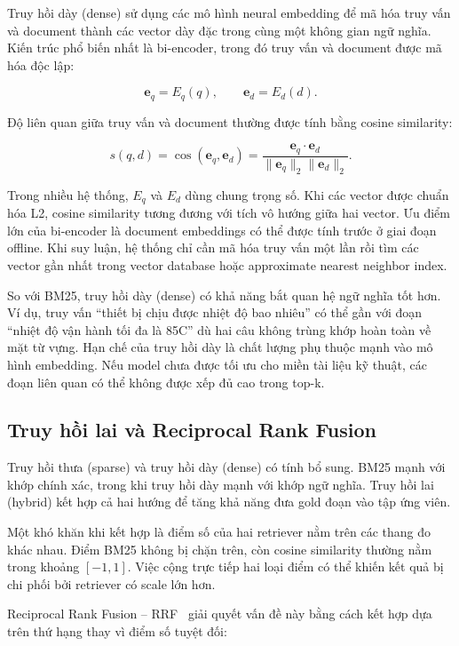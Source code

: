 \documentclass[../DoAn.tex]{subfiles}
\begin{document}
Truy hồi dày (dense) sử dụng các mô hình neural embedding để mã hóa truy vấn và document thành các vector dày đặc trong cùng một không gian ngữ nghĩa. Kiến trúc phổ biến nhất là bi-encoder, trong đó truy vấn và document được mã hóa độc lập:

\[
\mathbf{e}_q = E_q(q),
\qquad
\mathbf{e}_d = E_d(d).
\]

Độ liên quan giữa truy vấn và document thường được tính bằng cosine similarity:

\[
s(q,d)
=
\cos(\mathbf{e}_q,\mathbf{e}_d)
=
\frac{
\mathbf{e}_q \cdot \mathbf{e}_d
}{
\|\mathbf{e}_q\|_2 \|\mathbf{e}_d\|_2
}.
\]

Trong nhiều hệ thống, $E_q$ và $E_d$ dùng chung trọng số. Khi các vector được chuẩn hóa L2, cosine similarity tương đương với tích vô hướng giữa hai vector. Ưu điểm lớn của bi-encoder là document embeddings có thể được tính trước ở giai đoạn offline. Khi suy luận, hệ thống chỉ cần mã hóa truy vấn một lần rồi tìm các vector gần nhất trong vector database hoặc approximate nearest neighbor index.

So với BM25, truy hồi dày (dense) có khả năng bắt quan hệ ngữ nghĩa tốt hơn. Ví dụ, truy vấn ``thiết bị chịu được nhiệt độ bao nhiêu'' có thể gần với đoạn ``nhiệt độ vận hành tối đa là 85\textdegree C'' dù hai câu không trùng khớp hoàn toàn về mặt từ vựng. Hạn chế của truy hồi dày là chất lượng phụ thuộc mạnh vào mô hình embedding. Nếu model chưa được tối ưu cho miền tài liệu kỹ thuật, các đoạn liên quan có thể không được xếp đủ cao trong top-k.

\subsection{Truy hồi lai và Reciprocal Rank Fusion}
\label{subsection:2.2.3}

Truy hồi thưa (sparse) và truy hồi dày (dense) có tính bổ sung. BM25 mạnh với khớp chính xác, trong khi truy hồi dày mạnh với khớp ngữ nghĩa. Truy hồi lai (hybrid) kết hợp cả hai hướng để tăng khả năng đưa gold đoạn vào tập ứng viên.

Một khó khăn khi kết hợp là điểm số của hai retriever nằm trên các thang đo khác nhau. Điểm BM25 không bị chặn trên, còn cosine similarity thường nằm trong khoảng $[-1,1]$. Việc cộng trực tiếp hai loại điểm có thể khiến kết quả bị chi phối bởi retriever có scale lớn hơn.

Reciprocal Rank Fusion -- RRF~\cite{cormack2009rrf} giải quyết vấn đề này bằng cách kết hợp dựa trên thứ hạng thay vì điểm số tuyệt đối:
\end{document}
